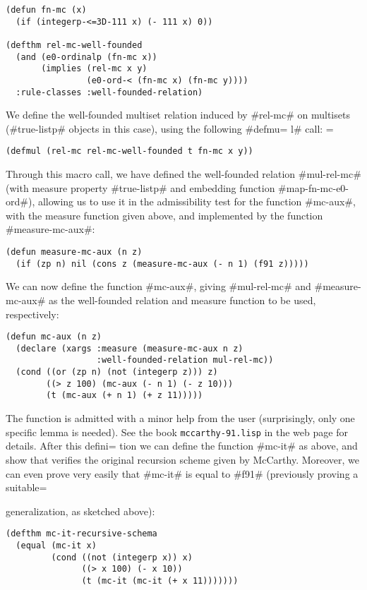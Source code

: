 \documentclass[11pt]{llncs}
\begin{document}
{\begin{verbatim}
(defun fn-mc (x)
  (if (integerp-<=3D-111 x) (- 111 x) 0))

(defthm rel-mc-well-founded
  (and (e0-ordinalp (fn-mc x))
       (implies (rel-mc x y)
                (e0-ord-< (fn-mc x) (fn-mc y))))
  :rule-classes :well-founded-relation)
\end{verbatim}

We define the well-founded multiset relation induced by #rel-mc# on
multisets (#true-listp# objects in this case), using the following #defmu=
l#
call: =


\begin{verbatim}
(defmul (rel-mc rel-mc-well-founded t fn-mc x y))
\end{verbatim}

Through this macro call, we have defined the well-founded relation
#mul-rel-mc# (with measure property #true-listp# and embedding function
#map-fn-mc-e0-ord#), allowing us to use it in the admissibility test for
the function #mc-aux#, with the measure function given above, and
implemented by the function #measure-mc-aux#:

\begin{verbatim}
(defun measure-mc-aux (n z)
  (if (zp n) nil (cons z (measure-mc-aux (- n 1) (f91 z)))))
\end{verbatim}

We can now define the function #mc-aux#, giving #mul-rel-mc# and
#measure-mc-aux# as the well-founded relation and measure function to be
used, respectively:

\begin{verbatim}
(defun mc-aux (n z)
  (declare (xargs :measure (measure-mc-aux n z)
                  :well-founded-relation mul-rel-mc))
  (cond ((or (zp n) (not (integerp z))) z)
        ((> z 100) (mc-aux (- n 1) (- z 10)))
        (t (mc-aux (+ n 1) (+ z 11)))))
\end{verbatim}

The function is admitted with a minor help from the user (surprisingly,
only one specific lemma is needed). See the book
{\tt mccar\-thy-91.\-lisp} in the web page for details. After this defini=
tion we
can define the function #mc-it# as above, and show that verifies the
original recursion scheme given by McCarthy. Moreover, we can even prove
very easily that #mc-it# is equal to #f91# (previously proving a suitable=

generalization, as sketched above):

\begin{verbatim}
(defthm mc-it-recursive-schema
  (equal (mc-it x)
         (cond ((not (integerp x)) x)
               ((> x 100) (- x 10))
               (t (mc-it (mc-it (+ x 11)))))))


\end{verbatim}}
\end{document}
